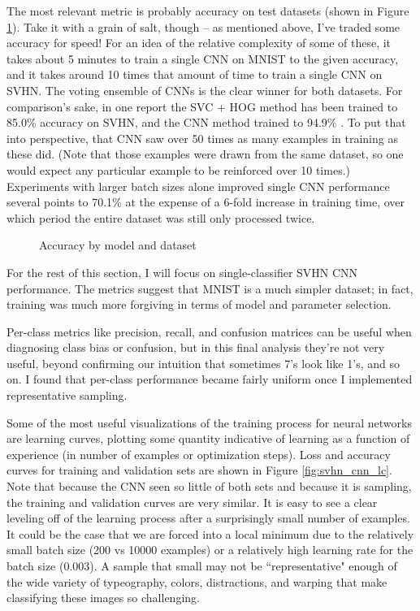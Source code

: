 \documentclass{article}
\begin{document}
The most relevant metric is probably accuracy on test datasets (shown in Figure \ref{fig:accuracy}). Take it with a grain of salt, though -- as mentioned above, I've traded some accuracy for speed! For an idea of the relative complexity of some of these, it takes about 5 minutes to train a single CNN on MNIST to the given accuracy, and it takes around 10 times that amount of time to train a single CNN on SVHN. The voting ensemble of CNNs is the clear winner for both datasets. For comparison's sake, in one report the SVC + HOG method has been trained to 85.0\% accuracy on SVHN, and the CNN method trained to 94.9\% \cite{sermanet2012convolutional}. To put that into perspective, that CNN saw over 50 times as many examples in training as these did. (Note that those examples were drawn from the same dataset, so one would expect any particular example to be reinforced over 10 times.)  Experiments with larger batch sizes alone improved single CNN performance several points to 70.1\% at the expense of a 6-fold increase in training time, over which period the entire dataset was still only processed twice.

\begin{figure}[htbp]
\centering
{}
\caption{Accuracy by model and dataset}
\label{fig:accuracy}
\end{figure}

For the rest of this section, I will focus on single-classifier SVHN CNN performance. The metrics suggest that MNIST is a much simpler dataset; in fact, training was much more forgiving in terms of model and parameter selection.

Per-class metrics like precision, recall, and confusion matrices can be useful when diagnosing class bias or confusion, but in this final analysis they're not very useful, beyond confirming our intuition that sometimes 7's look like 1's, and so on. I found that per-class performance became fairly uniform once I implemented representative sampling.

Some of the most useful visualizations of the training process for neural networks are learning curves, plotting some quantity indicative of learning as a function of experience (in number of examples or optimization steps). Loss and accuracy curves for training and validation sets are shown in Figure \ref{fig:svhn_cnn_lc}. Note that because the CNN seen so little of both sets and because it is sampling, the training and validation curves are very similar. It is easy to see a clear leveling off of the learning process after a surprisingly small number of examples. It could be the case that we are forced into a local minimum due to the relatively small batch size (200 vs 10000 examples) or a relatively high learning rate for the batch size (0.003). A sample that small may not be ``representative" enough of the wide variety of typeography, colors, distractions, and warping that make classifying these images so challenging.
\end{document}
